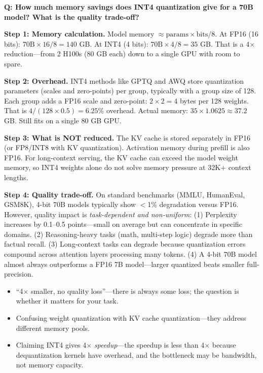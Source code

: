\begin{interviewq}
\textbf{Q: How much memory savings does INT4 quantization give for a 70B model? What is the quality trade-off?}

 \quad {} \quad \badgefreq{\freqhigh}

\stronganswer

\textbf{Step 1: Memory calculation.} Model memory $\approx \text{params} \times \text{bits} / 8$. At FP16 (16 bits): $70\text{B} \times 16 / 8 = 140$ GB. At INT4 (4 bits): $70\text{B} \times 4 / 8 = 35$ GB. That is a 4$\times$ reduction---from 2 H100s (80 GB each) down to a single GPU with room to spare.

\textbf{Step 2: Overhead.} INT4 methods like GPTQ and AWQ store quantization parameters (scales and zero-points) per group, typically with a group size of 128. Each group adds a FP16 scale and zero-point: $2 \times 2 = 4$ bytes per 128 weights. That is $4 / (128 \times 0.5) = 6.25\%$ overhead. Actual memory: $35 \times 1.0625 \approx 37.2$ GB. Still fits on a single 80 GB GPU.

\textbf{Step 3: What is NOT reduced.} The KV cache is stored separately in FP16 (or FP8/INT8 with KV quantization). Activation memory during prefill is also FP16. For long-context serving, the KV cache can exceed the model weight memory, so INT4 weights alone do not solve memory pressure at 32K+ context lengths.

\textbf{Step 4: Quality trade-off.} On standard benchmarks (MMLU, HumanEval, GSM8K), 4-bit 70B models typically show $<$1\% degradation versus FP16. However, quality impact is \textit{task-dependent and non-uniform}: (1) Perplexity increases by 0.1--0.5 points---small on average but can concentrate in specific domains. (2) Reasoning-heavy tasks (math, multi-step logic) degrade more than factual recall. (3) Long-context tasks can degrade because quantization errors compound across attention layers processing many tokens. (4) A 4-bit 70B model almost always outperforms a FP16 7B model---larger quantized beats smaller full-precision.

\redflags
\begin{itemize}
    \item ``4$\times$ smaller, no quality loss''---there is always some loss; the question is whether it matters for your task.
    \item Confusing weight quantization with KV cache quantization---they address different memory pools.
    \item Claiming INT4 gives 4$\times$ \textit{speedup}---the speedup is less than 4$\times$ because dequantization kernels have overhead, and the bottleneck may be bandwidth, not memory capacity.
\end{itemize}


\end{interviewq}
